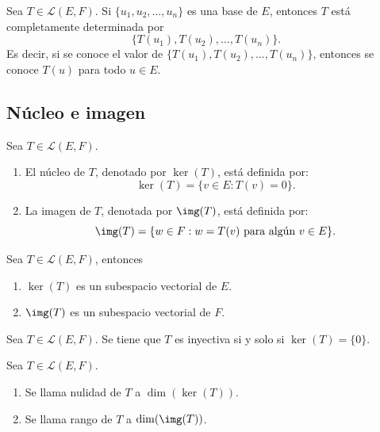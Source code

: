 \documentclass[a4,11pt]{aleph-notas}
\begin{document}
\begin{teo}
    Sea $T \in \mathcal{L}(E,F)$. Si $\{u_1,u_2,\ldots,u_n\}$ es una base de $E$, entonces $T$ está completamente determinada por
    \[
        \{T(u_1),T(u_2),\ldots,T(u_n)\}.
    \]
    Es decir, si se conoce el valor de $\{T(u_1),T(u_2),\ldots,T(u_n)\}$, entonces se conoce $T(u)$ para todo $u\in E$.
\end{teo}


\subsection{Núcleo e imagen}

\begin{defi}
    Sea $T \in \mathcal{L}(E,F)$.
    \begin{enumerate}
    \item 
        El núcleo de $T$, denotado por $\ker(T)$, está definida por:
        \[
            \ker(T) = \{v \in E: T(v) = 0\}.
        \]
    \item 
        La imagen de $T$, denotada por $\img(T)$, está definida por:
        \[
            \img(T) = \{ w \in F: w = T(v) \text{ para algún } v \in E\}.
        \]
    \end{enumerate}
\end{defi}

\begin{teo}
    Sea $T \in \mathcal{L}(E,F)$, entonces
    \begin{enumerate}
    \item 
        $\ker(T)$ es un subespacio vectorial de $E$.
    \item 
        $\img(T)$ es un subespacio vectorial de $F$.
    \end{enumerate}
\end{teo}
    
\begin{teo}
    Sea $T \in \mathcal{L}(E,F)$. Se tiene que $T$ es inyectiva si y solo si $\ker(T)=\{0\}$.
\end{teo}

\begin{defi}
    Sea $T \in \mathcal{L}(E,F)$.
    \begin{enumerate}
    \item 
        Se llama nulidad de $T$ a $\dim(\ker(T))$.
    \item 
        Se llama rango de $T$ a $\dim(\img(T))$.
    \end{enumerate}
\end{defi}
\end{document}
